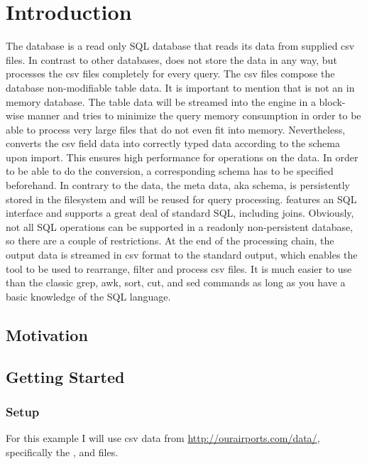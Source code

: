 
\chapter{Introduction}
The \csvsqldb{} database is a read only SQL database that reads its data from supplied csv files. In contrast to other databases, \csvsqldb{} does not store the data in any way, but processes the csv files completely for every query. The csv files compose the database non-modifiable table data. It is important to mention that \csvsqldb{} is not an in memory database. The table data will be streamed into the engine in a block-wise manner and \csvsqldb{} tries to minimize the query memory consumption in order to be able to process very large files that do not even fit into memory. Nevertheless, \csvsqldb{} converts the csv field data into correctly typed data according to the schema upon import. This ensures high performance for operations on the data. In order to be able to do the conversion, a corresponding schema has to be specified beforehand. In contrary to the data, the meta data, aka schema, is persistently stored in the filesystem and will be reused for query processing. \csvsqldb{} features an SQL interface and supports a great deal of standard SQL, including joins. Obviously, not all SQL operations can be supported in a readonly non-persistent database, so there are a couple of restrictions. At the end of the processing chain, the output data is streamed in csv format to the standard output, which enables the tool to be used to rearrange, filter and process csv files. It is much easier to use than the classic grep, awk, sort, cut, and sed commands as long as you have a basic knowledge of the SQL language.

\section{Motivation}

\section{Getting Started}

\subsection{Setup}
For this example I will use csv data from {\scriptsize \url{http://ourairports.com/data/}}, specifically the ,  and  files.

